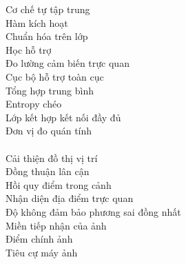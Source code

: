 \begin{keyword}
                    {Cơ chế tự tập trung}           \\
               {Hàm kích hoạt}                 \\
               {Chuẩn hóa trên lớp}            \\
                {Học hỗ trợ}                    \\
                   {Đo lường cảm biến trực quan}   \\
              {Cục bộ hỗ trợ toàn cục}        \\
                   {Tổng hợp trung bình}           \\
                     {Entropy chéo}                  \\
      {Lớp kết hợp kết nối đầy đủ}    \\
         {Đơn vị đo quán tính}           \\
      \\
           {Cải thiện đồ thị vị trí}       \\
            {Đồng thuận lân cận}	 		\\ 
            {Hồi quy điểm trong cảnh} 		\\
          {Nhận diện địa điểm trực quan} 	\\
         {Độ không đảm bảo phương sai đồng nhất} \\
                   {Miền tiếp nhận của ảnh}		\\
                   {Điểm chính ảnh}                \\
                      {Tiêu cự máy ảnh}               \\
\end{keyword}

